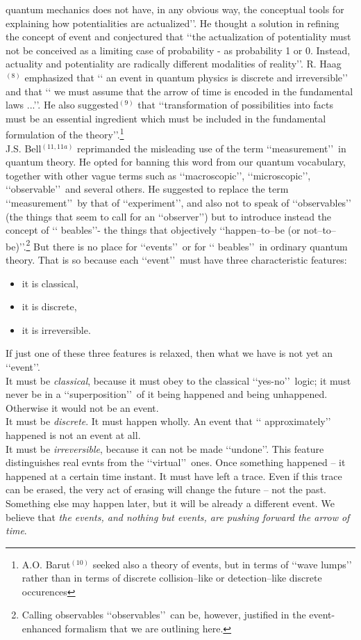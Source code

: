 \documentclass[12pt]{article}
\def\lqq{\lq\lq}
\def\rqq{\rq\rq}
\begin{document}
quantum mechanics does not have, in any obvious way, the conceptual tools for
explaining how potentialities are actualized\rqq. He thought a solution in
refining the concept of event and conjectured that \lqq the actualization of
potentiality must not be conceived as a limiting case of probability -
as probability 1 or 0. Instead, actuality and potentiality are radically
different modalities of reality\rqq. R. Haag$^{(8)}$ emphasized that \lqq
an event in quantum physics is discrete and irreversible\rqq\, and that \lqq
we must assume that the arrow of time is encoded in the fundamental laws
...\rqq.
He also suggested$^{(9)}$ that \lqq  transformation of possibilities into
facts must be an essential ingredient which must be included in the
fundamental formulation of the theory\rqq.\footnote{A.O. Barut$^{(10)}$
seeked also a theory of events, but in terms of \lqq wave lumps\rqq\,
rather
than in terms of discrete collision--like or detection--like discrete
occurences}\\
J.S. Bell$^{(11,11a)}$ reprimanded the misleading use of the term
\lqq measurement\rqq\,  in quantum theory. He opted for banning this word
from
our
quantum vocabulary, together with other vague terms such as
\lqq macroscopic\rqq, \lqq microscopic\rqq, \lqq observable\rqq\,  and
several others. He suggested to replace the term \lqq measurement\rqq\,  by
that of \lqq experiment\rqq, and
also not to speak of \lqq observables\rqq\,  (the things that seem to call
for an
\lqq observer\rqq) but to introduce instead the concept of \lqq
beables\rqq  - the
things that objectively \lqq happen--to--be (or
not--to--be)\rqq.\footnote{Calling observables \lqq observables\rqq\,  can
be,
however, justified in the event-enhanced formalism that we are outlining
here.} But there is no place for \lqq events\rqq\,  or for \lqq
beables\rqq\, in ordinary
quantum theory. That is so because each \lqq event\rqq\,  must have three
characteristic features:
\begin{itemize}
\item it is classical,
\item it is discrete,
\item it is irreversible.
\end{itemize}
If just one of these three features is relaxed, then what we have is not
yet an \lqq event\rqq.\\
It must be {\sl classical}, because it must obey to the classical
\lqq yes-no\rqq\,  logic; it must never be in a \lqq superposition\rqq\,  of
it being happened and being unhappened. Otherwise it would not be an event.\\
It must be {\sl discrete}. It must happen wholly. An event that \lqq
approximately\rqq\, happened is not an event at all.\\
It must be {\sl irreversible}, because it can not be made \lqq undone\rqq.
This feature distinguishes real evnts from the \lqq virtual\rqq\,  ones. Once
something happened -- it happened at a certain time instant. It must
have left a trace. Even if this trace can be erased, the very act of
erasing will change the future -- not the past. Something else may
happen later, but it will be already a different event. We believe
that {\sl the events, and nothing but events, are pushing forward the
arrow of time}.
\end{document}
